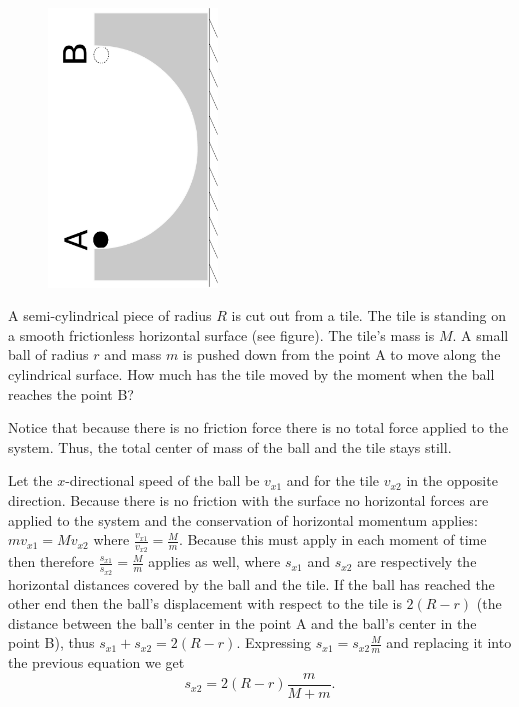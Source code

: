 {\ifEngStatement
\begin{figure}
	\vspace{-10pt}
	\includegraphics[angle=-90,origin=c,width=0.4\textwidth]{2016-v2g-08-halfpipe}
	\vspace{-60pt}
\end{figure}
A semi-cylindrical piece of radius $R$ is cut out from a tile. The tile is standing on a smooth frictionless horizontal surface (see figure). The tile’s mass is $M$. A small ball of radius $r$ and mass $m$ is pushed down from the point A to move along the cylindrical surface. How much has the tile moved by the moment when the ball reaches the point B?
\fi


\ifEngHint
Notice that because there is no friction force there is no total force applied to the system. Thus, the total center of mass of the ball and the tile stays still.
\fi


\ifEngSolution
Let the $x$-directional speed of the ball be $v_{x1}$ and for the tile $v_{x2}$ in the opposite direction. Because there is no friction with the surface no horizontal forces are applied to the system and the conservation of horizontal momentum applies: $mv_{x1}=Mv_{x2}$ where $\frac{v_{x1}}{v_{x2}}=\frac{M}{m}$. Because this must apply in each moment of time then therefore $\frac{s_{x1}}{s_{x2}}=\frac{M}{m}$ applies as well, where $s_{x1}$ and $s_{x2}$ are respectively the horizontal distances covered by the ball and the tile. If the ball has reached the other end then the ball’s displacement with respect to the tile is $2(R-r)$ (the distance between the ball’s center in the point A and the ball’s center in the point B), thus $s_{x1}+s_{x2}=2(R-r)$. Expressing $s_{x1} = s_{x2}\frac Mm$ and replacing it into the previous equation we get
$$s_{x2}=2(R-r)\frac{m}{M+m}.$$
\fi
}